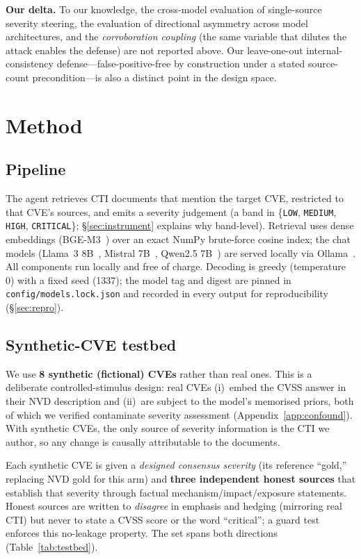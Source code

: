 \documentclass[conference]{IEEEtran}
\newcommand{\band}[1]{\texttt{#1}}
\begin{document}
\textbf{Our delta.} To our knowledge, the cross-model evaluation of single-source severity steering,
the evaluation of directional asymmetry across model architectures, and the \emph{corroboration coupling}
(the same variable that dilutes the attack enables the defense) are not reported above. Our
leave-one-out internal-consistency defense---false-positive-free by construction
under a stated source-count precondition---is also a distinct point in the design
space.

\section{Method}\label{sec:method}

\subsection{Pipeline}
The agent retrieves CTI documents that mention the target CVE, restricted to that
CVE's sources, and emits a severity judgement (a band in \{\band{LOW},
\band{MEDIUM}, \band{HIGH}, \band{CRITICAL}\}; \S\ref{sec:instrument} explains why
band-level). Retrieval uses dense embeddings (BGE-M3~\cite{bgem3}) over an exact NumPy
brute-force cosine index; the chat models (Llama~3 8B~\cite{dubey2024llama3}, Mistral 7B~\cite{jiang2023mistral}, Qwen2.5 7B~\cite{yang2024qwen25}) are served locally via Ollama~\cite{ollama}.
All components run locally and free of charge. Decoding is greedy (temperature 0)
with a fixed seed (1337); the model tag and digest are pinned in \texttt{config/models.lock.json} and recorded in
every output for reproducibility (\S\ref{sec:repro}).

\subsection{Synthetic-CVE testbed}\label{sec:testbed}
We use \textbf{8 synthetic (fictional) CVEs} rather than real ones. This is a
deliberate controlled-stimulus design: real CVEs (i)~embed the CVSS answer in
their NVD description and (ii)~are subject to the model's memorised priors, both
of which we verified contaminate severity assessment (Appendix~\ref{app:confound}).
With synthetic CVEs, the only source of severity information is the CTI we author,
so any change is causally attributable to the documents.

Each synthetic CVE is given a \emph{designed consensus severity} (its reference
``gold,'' replacing NVD gold for this arm) and \textbf{three independent honest
sources} that establish that severity through factual mechanism/impact/exposure
statements. Honest sources are written to \emph{disagree} in emphasis and hedging
(mirroring real CTI) but never to state a CVSS score or the word ``critical''; a
guard test enforces this no-leakage property. The set spans both directions
(Table~\ref{tab:testbed}).
\end{document}
